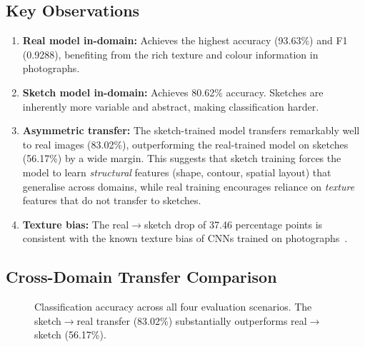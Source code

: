 \documentclass[12pt, a4paper]{article}
\begin{document}
\subsection{Key Observations}

\begin{enumerate}[leftmargin=*]
    \item \textbf{Real model in-domain:} Achieves the highest accuracy
          (93.63\%) and F1 (0.9288), benefiting from the rich texture and
          colour information in photographs.
    \item \textbf{Sketch model in-domain:} Achieves 80.62\% accuracy.  Sketches
          are inherently more variable and abstract, making classification
          harder.
    \item \textbf{Asymmetric transfer:} The sketch-trained model transfers
          remarkably well to real images (83.02\%), outperforming the
          real-trained model on sketches (56.17\%) by a wide margin.  This
          suggests that sketch training forces the model to learn
          \emph{structural} features (shape, contour, spatial layout) that
          generalise across domains, while real training encourages reliance on
          \emph{texture} features that do not transfer to sketches.
    \item \textbf{Texture bias:} The real$\to$sketch drop of 37.46 percentage
          points is consistent with the known texture bias of CNNs trained on
          photographs~\cite{geirhos2019texture}.
\end{enumerate}

\subsection{Cross-Domain Transfer Comparison}

\begin{figure}[H]
\centering
{}
\caption{Classification accuracy across all four evaluation scenarios.  The
sketch$\to$real transfer (83.02\%) substantially outperforms real$\to$sketch
(56.17\%).}
\label{fig:eval_bar}
\end{figure}
\end{document}
